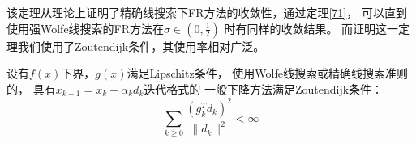             该定理从理论上证明了精确线搜索下FR方法的收敛性，通过定理\ref{71}，
            可以直到使用强Wolfe线搜索的FR方法在$\sigma\in(0,\frac{1}{2})$
            时有同样的收敛结果。
            而证明这一定理我们使用了Zoutendijk条件，其使用率相对广泛。
        
        \begin{theorem}[Zoutendijk条件]\cite*{Book1}
            设有$f(x)$下界，$g(x)$满足Lipschitz条件，
            使用Wolfe线搜索或精确线搜索准则的，
            具有$x_{k+1}=x_{k}+\alpha_kd_k$迭代格式的
            一般下降方法满足Zoutendijk条件：
            \begin{equation}
            \displaystyle\sum_{k\geq0}\frac{(g_k^Td_k)^2}{\|d_k\|^2}<\infty
            \end{equation}
        \end{theorem}
